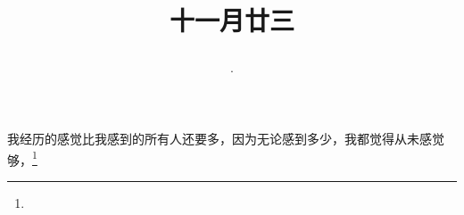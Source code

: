 \title{\date[d=4,m=1,y=2024][year:cn-y,年,month:cn,day:cn,日,·,weekday]·十一月廿三 }
我经历的感觉比我感到的所有人还要多，因为无论感到多少，我都觉得从未感觉够，\footnote{ }

